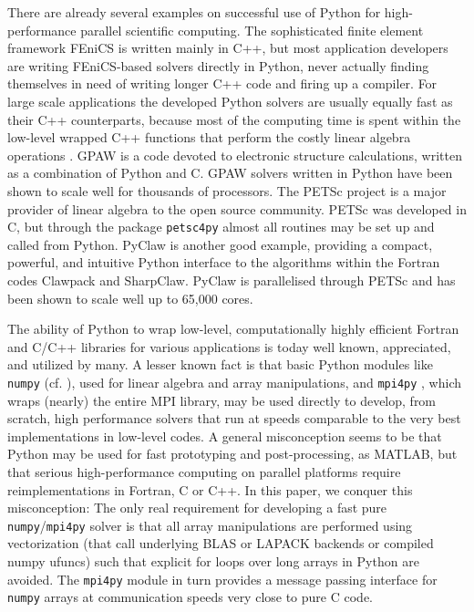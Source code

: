 \documentclass[final,1p,times]{elsarticle}
\begin{document}
There are already several examples on successful use of Python for
high-performance parallel scientific computing. The sophisticated
finite element framework FEniCS \cite{fenics} is written mainly in
C++, but most application developers are writing FEniCS-based solvers
directly in Python, never actually finding themselves in need of
writing longer C++ code and firing up a compiler. For large scale
applications the developed Python solvers are usually equally fast as
their C++ counterparts, because most of the computing time is
spent within the low-level wrapped C++ functions that perform the
costly linear algebra operations \cite{Mortensen2015}.
GPAW \cite{gpaw05} is a code devoted
to electronic structure calculations, written as a combination of
Python and C. GPAW solvers written in Python have been shown to scale
well for thousands of processors.  The PETSc project \cite{petsc-web-page} is a major
provider of linear algebra to the open source community. PETSc was
developed in C, but through the package \texttt{petsc4py} almost all
routines may be set up and called from Python. PyClaw \cite{ketcheson2012}
is another good example, providing a compact, powerful, and intuitive
Python interface to the algorithms within the Fortran codes Clawpack
and SharpClaw. PyClaw is parallelised through PETSc and has been shown
to scale well up to 65,000 cores.

The ability of Python to wrap low-level, computationally highly efficient Fortran and C/C++ libraries for various applications is today well known, appreciated, and utilized by many. A lesser known fact is that basic Python modules like \texttt{numpy} (cf. \cite{numpy, van2011numpy}), used for linear algebra and array manipulations, and \texttt{mpi4py} \cite{mpi4py}, which wraps (nearly) the entire MPI library, may be used directly to develop, from scratch, high performance solvers that run at speeds comparable to the very best implementations in low-level codes. A general misconception seems to be that Python may be used for fast prototyping and post-processing, as MATLAB, but that serious high-performance computing on parallel platforms require reimplementations in Fortran, C or C++. In this paper, we conquer this misconception: The only real requirement for developing a fast pure \texttt{numpy}/\texttt{mpi4py} solver is that all array manipulations are performed using vectorization (that call underlying BLAS or LAPACK backends or compiled numpy ufuncs) such that explicit for loops over long arrays in Python are avoided. The \texttt{mpi4py} module in turn provides a message passing interface for \texttt{numpy} arrays at communication speeds very close to pure C code.
\end{document}
